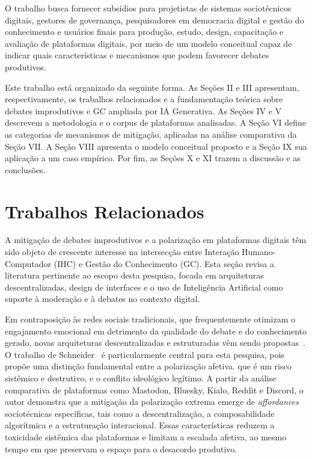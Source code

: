 \documentclass[conference]{IEEEtran} \IEEEoverridecommandlockouts %
\begin{document}
O trabalho busca fornecer subsídios para projetistas de sistemas sociotécnicos digitais, gestores de governança, pesquisadores em democracia digital e gestão do conhecimento e usuários finais para produção, estudo, design, capacitação e avaliação de plataformas digitais, por meio de um modelo conceitual capaz de indicar quais características e mecanismos que podem favorecer debates produtivos. 

Este trabalho está organizado da seguinte forma. As Seções II e III apresentam, respectivamente, os trabalhos relacionados e a fundamentação teórica sobre debates improdutivos e GC ampliada por IA Generativa. As Seções IV e V descrevem a metodologia e o corpus de plataformas analisadas. A Seção VI define as categorias de mecanismos de mitigação, aplicadas na análise comparativa da Seção VII. A Seção VIII apresenta o modelo conceitual proposto e a Seção IX sua aplicação a um caso empírico. Por fim, as Seções X e XI trazem a discussão e as conclusões.


\section{Trabalhos Relacionados}

A mitigação de debates improdutivos e a polarização em plataformas digitais têm sido objeto de crescente interesse na intersecção entre Interação Humano-Computador (IHC) e Gestão do Conhecimento (GC). Esta seção revisa a literatura pertinente ao escopo desta pesquisa, focada em arquiteturas descentralizadas, design de interfaces e o uso de Inteligência Artificial como suporte à moderação e à debates no contexto digital.



Em contraposição às redes sociais tradicionais, que frequentemente otimizam o engajamento emocional em detrimento da qualidade do debate e do conhecimento gerado, novas arquiteturas descentralizadas e estruturadas vêm sendo propostas~\cite{nelimarkkaReDesignMitigatePolitical2019, zhangAttitudesImaginedRoles2026}. O trabalho de Schneider~\cite{schneider2026mitigating} é particularmente central para esta pesquisa, pois propõe uma distinção fundamental entre a polarização afetiva. que é um risco sistêmico e destrutivo, e o conflito ideológico legítimo. A partir da análise comparativa de plataformas como Mastodon, Bluesky, Kialo, Reddit e Discord, o autor demonstra que a mitigação da polarização extrema emerge de \textit{affordances} sociotécnicas específicas, tais como a descentralização, a composabilidade algorítmica e a estruturação interacional. Essas características reduzem a toxicidade sistêmica das plataformas e limitam a escalada afetiva, ao mesmo tempo em que preservam o espaço para o desacordo produtivo.
\end{document}
